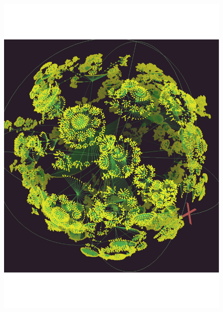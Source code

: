 \documentclass[aps,rmp,twocolumn,amsmath,amssymb,nofootinbib,superscriptaddress,longbibliography,floatfix,table-of-contents,eqsecnum]{revtex4-1}
\begin{document}
\begin{figure}[!htb]
\includegraphics[width=\columnwidth]{webgraph_1} \\

\end{figure}
\end{document}
